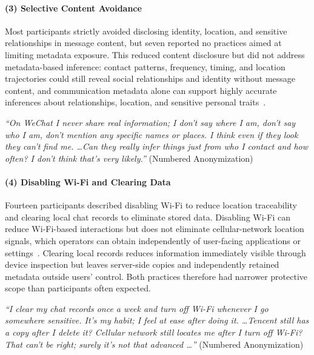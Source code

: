 \documentclass[conference,compsoc]{IEEEtran}
\begin{document}
\paragraph{\textbf{(3) Selective Content Avoidance}}
Most participants strictly avoided disclosing identity, location, and sensitive relationships in message content, but seven reported no practices aimed at limiting metadata exposure. This reduced content disclosure but did not address metadata-based inference: contact patterns, frequency, timing, and location trajectories could still reveal social relationships and identity without message content, and communication metadata alone can support highly accurate inferences about relationships, location, and sensitive personal traits~\cite{mayer2016evaluating}.

\begin{displayquote}
\textit{``On WeChat I never share real information; I don't say where I am, don't say who I am, don't mention any specific names or places. I think even if they look they can't find me. \ldots Can they really infer things just from who I contact and how often? I don't think that's very likely.''} (Numbered Anonymization)
\end{displayquote}

\paragraph{\textbf{(4) Disabling Wi-Fi and Clearing Data}}
Fourteen participants described disabling Wi-Fi to reduce location traceability and clearing local chat records to eliminate stored data. Disabling Wi-Fi can reduce Wi-Fi-based interactions but does not eliminate cellular-network location signals, which operators can obtain independently of user-facing applications or settings~\cite{tomasin2021location}. Clearing local records reduces information immediately visible through device inspection but leaves server-side copies and independently retained metadata outside users' control. Both practices therefore had narrower protective scope than participants often expected.

\begin{displayquote}
\textit{``I clear my chat records once a week and turn off Wi-Fi whenever I go somewhere sensitive. It's my habit; I feel at ease after doing it. \ldots Tencent still has a copy after I delete it? Cellular network still locates me after I turn off Wi-Fi? That can't be right; surely it's not that advanced \ldots''} (Numbered Anonymization)
\end{displayquote}
\end{document}
